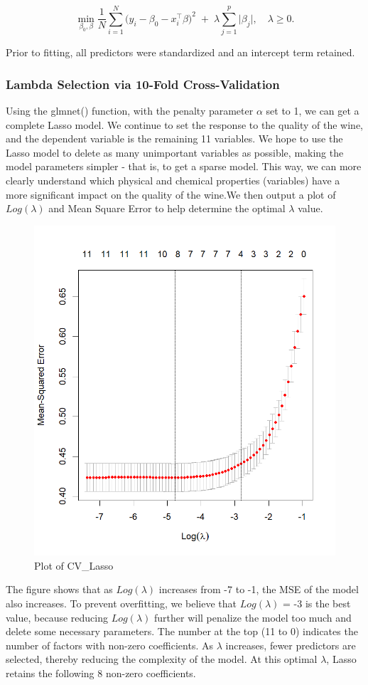 \documentclass[
  doc,floatsintext]{apa6}
\begin{document}
\begin{equation}
\label{eq:lasso}
\min_{\beta_0,\beta}
  \frac{1}{N}\sum_{i=1}^N \bigl(y_i - \beta_0 - x_i^\top \beta\bigr)^2
  \;+\;
  \lambda \sum_{j=1}^p \lvert \beta_j\rvert,
\quad
\lambda \ge 0.
\end{equation}

Prior to fitting, all predictors were standardized and an intercept term retained.

\subsubsection{Lambda Selection via 10-Fold Cross-Validation}\label{lambda-selection-via-10-fold-cross-validation}

Using the glmnet() function, with the penalty parameter \(α\) set to 1, we can get a complete Lasso model. We continue to set the response to the quality of the wine, and the dependent variable is the remaining 11 variables. We hope to use the Lasso model to delete as many unimportant variables as possible, making the model parameters simpler - that is, to get a sparse model. This way, we can more clearly understand which physical and chemical properties (variables) have a more significant impact on the quality of the wine.We then output a plot of \(Log(λ)\) and Mean Square Error to help determine the optimal \(λ\) value.

\begin{figure}[H]

{\centering \includegraphics[width=0.5\linewidth]{../plots/cv_lasso} 

}

\caption{Plot of CV\_Lasso}\label{fig:fig-cv-lasso}
\end{figure}

The figure shows that as \(Log(λ)\) increases from -7 to -1, the MSE of the model also increases. To prevent overfitting, we believe that \(Log(λ)\) = -3 is the best value, because reducing \(Log(λ)\) further will penalize the model too much and delete some necessary parameters. The number at the top (11 to 0) indicates the number of factors with non-zero coefficients. As \(λ\) increases, fewer predictors are selected, thereby reducing the complexity of the model. At this optimal \(λ\), Lasso retains the following 8 non-zero coefficients.
\end{document}
